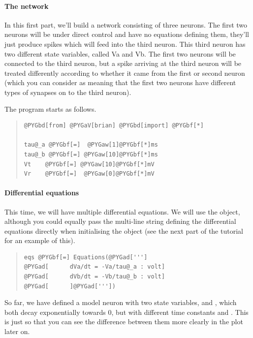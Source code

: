 \documentclass[letterpaper,10pt,english]{manual}
\begin{document}
\paragraph{The network}

In this first part, we'll build a network consisting of three neurons. The
first two neurons will be under direct control and have no equations
defining them, they'll just produce spikes which will feed into the third
neuron. This third neuron has two different state variables, called Va
and Vb. The first two neurons will be connected to the third neuron, but
a spike arriving at the third neuron will be treated differently
according to whether it came from the first or second neuron (which you
can consider as meaning that the first two neurons have different
types of synapses on to the third neuron).

The program starts as follows.
\begin{quote}

\begin{Verbatim}[commandchars=@\[\]]
@PYGbd[from] @PYGaV[brian] @PYGbd[import] @PYGbf[*]

tau@_a @PYGbf[=]  @PYGaw[1]@PYGbf[*]ms
tau@_b @PYGbf[=] @PYGaw[10]@PYGbf[*]ms
Vt    @PYGbf[=] @PYGaw[10]@PYGbf[*]mV
Vr    @PYGbf[=]  @PYGaw[0]@PYGbf[*]mV
\end{Verbatim}
\end{quote}


\paragraph{Differential equations}

This time, we will have multiple differential equations. We will use the
\hyperlink{brian.Equations}{} object, although you could equally pass the multi-line string
defining the differential equations directly when initialising the \hyperlink{brian.NeuronGroup}{}
object (see the next part of the tutorial for an example of this).
\begin{quote}

\begin{Verbatim}[commandchars=@\[\]]
eqs @PYGbf[=] Equations(@PYGad[''']
@PYGad[      dVa/dt = -Va/tau@_a : volt]
@PYGad[      dVb/dt = -Vb/tau@_b : volt]
@PYGad[      ]@PYGad['''])
\end{Verbatim}
\end{quote}

So far, we have defined a model neuron with two state variables, 
and , which both decay exponentially towards 0, but with different
time constants  and . This is just so that you can see
the difference between them more clearly in the plot later on.
\end{document}
